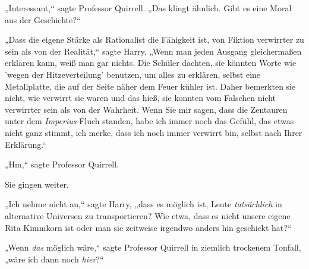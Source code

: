 „Interessant,“ sagte Professor Quirrell. „Das klingt ähnlich. Gibt es eine Moral aus der Geschichte?“

„Dass die eigene Stärke als Rationalist die Fähigkeit ist, von Fiktion verwirrter zu sein als von der Realität,“ sagte Harry. „Wenn man jeden Ausgang gleichermaßen erklären kann, weiß man gar nichts. Die Schüler dachten, sie könnten Worte wie 'wegen der Hitzeverteilung' benutzen, um alles zu erklären, selbst eine Metallplatte, die auf der Seite näher dem Feuer kühler ist. Daher bemerkten sie nicht, wie verwirrt sie waren und das hieß, sie konnten vom Falschen nicht verwirrter sein als von der Wahrheit. Wenn Sie mir sagen, dass die Zentauren unter dem \emph{Imperius}-Fluch standen, habe ich immer noch das Gefühl, das etwas nicht ganz stimmt, ich merke, dass ich noch immer verwirrt bin, selbst nach Ihrer Erklärung.“

„Hm,“ sagte Professor Quirrell.

Sie gingen weiter.

„Ich nehme nicht an,“ sagte Harry, „dass es möglich ist, Leute \emph{tatsächlich} in alternative Universen zu transportieren? Wie etwa, dass es nicht unsere eigene Rita Kimmkorn ist oder man sie zeitweise irgendwo anders hin geschickt hat?“

„Wenn \emph{das} möglich wäre,“ sagte Professor Quirrell in ziemlich trockenem Tonfall, „wäre ich dann noch \emph{hier}?“

